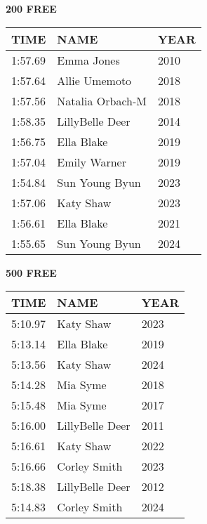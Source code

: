 \begin{table}[H]
\centering
\begin{minipage}[t]{0.48\textwidth}
\centering
\textbf{200 FREE}\\[0.1cm]
\begin{tabular}{@{}p{1.8cm}p{2.8cm}p{1.2cm}@{}}
\hline
    \textbf{TIME} & \textbf{NAME} & \textbf{YEAR} \\
\hline
    1:57.69 & Emma Jones & 2010 \\
    1:57.64 & Allie Umemoto & 2018 \\
    1:57.56 & Natalia Orbach-M & 2018 \\
    1:58.35 & LillyBelle Deer & 2014 \\
    1:56.75 & Ella Blake & 2019 \\
    1:57.04 & Emily Warner & 2019 \\
    1:54.84 & Sun Young Byun & 2023 \\
    1:57.06 & Katy Shaw & 2023 \\
    1:56.61 & Ella Blake & 2021 \\
    1:55.65 & Sun Young Byun & 2024 \\
\hline
\end{tabular}
\end{minipage}\hfill
\begin{minipage}[t]{0.48\textwidth}
\centering
\textbf{500 FREE}\\[0.1cm]
\begin{tabular}{@{}p{1.8cm}p{2.8cm}p{1.2cm}@{}}
\hline
    \textbf{TIME} & \textbf{NAME} & \textbf{YEAR} \\
\hline
    5:10.97 & Katy Shaw & 2023 \\
    5:13.14 & Ella Blake & 2019 \\
    5:13.56 & Katy Shaw & 2024 \\
    5:14.28 & Mia Syme & 2018 \\
    5:15.48 & Mia Syme & 2017 \\
    5:16.00 & LillyBelle Deer & 2011 \\
    5:16.61 & Katy Shaw & 2022 \\
    5:16.66 & Corley Smith & 2023 \\
    5:18.38 & LillyBelle Deer & 2012 \\
    5:14.83 & Corley Smith & 2024 \\
\hline
\end{tabular}
\end{minipage}
\end{table}

